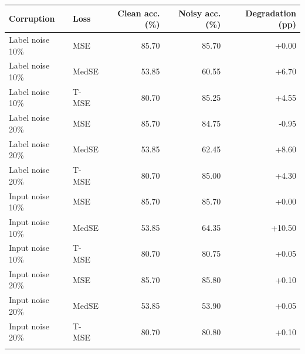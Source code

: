 \begin{tabular}{llrrr}
\toprule
Corruption & Loss & Clean acc. (\%) & Noisy acc. (\%) & Degradation (pp) \\
\midrule
Label noise 10\% & MSE & 85.70 & 85.70 & +0.00 \\
Label noise 10\% & MedSE & 53.85 & 60.55 & +6.70 \\
Label noise 10\% & T-MSE & 80.70 & 85.25 & +4.55 \\
\addlinespace
Label noise 20\% & MSE & 85.70 & 84.75 & -0.95 \\
Label noise 20\% & MedSE & 53.85 & 62.45 & +8.60 \\
Label noise 20\% & T-MSE & 80.70 & 85.00 & +4.30 \\
\addlinespace
Input noise 10\% & MSE & 85.70 & 85.70 & +0.00 \\
Input noise 10\% & MedSE & 53.85 & 64.35 & +10.50 \\
Input noise 10\% & T-MSE & 80.70 & 80.75 & +0.05 \\
\addlinespace
Input noise 20\% & MSE & 85.70 & 85.80 & +0.10 \\
Input noise 20\% & MedSE & 53.85 & 53.90 & +0.05 \\
Input noise 20\% & T-MSE & 80.70 & 80.80 & +0.10 \\
\addlinespace
\bottomrule
\end{tabular}